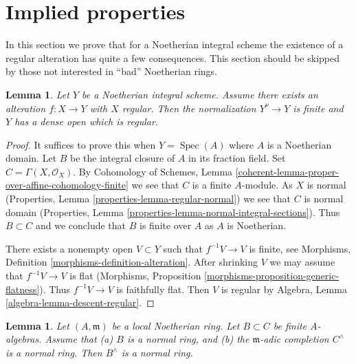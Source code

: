 \documentclass{stacks-project}
\theoremstyle{plain}
\newtheorem{lemma}[subsection]{Lemma}
\theoremstyle{definition}
\theoremstyle{remark}
\numberwithin{equation}{subsection}
\def\Spec{\mathop{\mathrm{Spec}}}
\begin{document}
\section{Implied properties}
\label{section-existence-gives}

\noindent
In this section we prove that for a Noetherian integral scheme
the existence of a regular alteration has quite a few consequences.
This section should be skipped by those not interested in
``bad'' Noetherian rings.

\begin{lemma}
\label{lemma-regular-alteration-implies}
Let $Y$ be a Noetherian integral scheme. Assume there exists an alteration
$f : X \to Y$ with $X$ regular. Then the normalization $Y^\nu \to Y$
is finite and $Y$ has a dense open which is regular.
\end{lemma}

\begin{proof}
It suffices to prove this when $Y = \Spec(A)$ where $A$ is a Noetherian domain.
Let $B$ be the integral closure of $A$ in its fraction field.
Set $C = \Gamma(X, \mathcal{O}_X)$. By
Cohomology of Schemes, Lemma
\ref{coherent-lemma-proper-over-affine-cohomology-finite}
we see that $C$ is a finite $A$-module. As $X$ is normal
(Properties, Lemma \ref{properties-lemma-regular-normal})
we see that $C$ is normal domain
(Properties, Lemma \ref{properties-lemma-normal-integral-sections}).
Thus $B \subset C$ and we conclude that $B$ is finite over $A$
as $A$ is Noetherian.

\medskip\noindent
There exists a nonempty open $V \subset Y$ such that $f^{-1}V \to V$
is finite, see Morphisms, Definition \ref{morphisms-definition-alteration}.
After shrinking $V$ we may assume that $f^{-1}V \to V$ is flat
(Morphisms, Proposition \ref{morphisms-proposition-generic-flatness}).
Thus $f^{-1}V \to V$ is faithfully flat. Then $V$ is regular by
Algebra, Lemma \ref{algebra-lemma-descent-regular}.
\end{proof}

\begin{lemma}
\label{lemma-algebra-helper}
Let $(A, \mathfrak m)$ be a local Noetherian ring. Let $B \subset C$
be finite $A$-algebras. Assume that (a) $B$ is a normal ring, and
(b) the $\mathfrak m$-adic completion $C^\wedge$ is a normal ring.
Then $B^\wedge$ is a normal ring.
\end{lemma}
\end{document}
